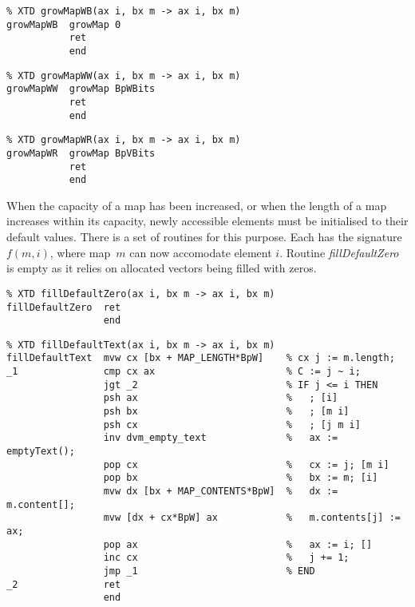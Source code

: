 {\small
\begin{verbatim}
% XTD growMapWB(ax i, bx m -> ax i, bx m)
growMapWB  growMap 0
           ret
           end
\end{verbatim}}

{\small
\begin{verbatim}
% XTD growMapWW(ax i, bx m -> ax i, bx m)
growMapWW  growMap BpWBits
           ret
           end
\end{verbatim}}

{\small
\begin{verbatim}
% XTD growMapWR(ax i, bx m -> ax i, bx m)
growMapWR  growMap BpVBits
           ret
           end
\end{verbatim}}

When the capacity of a map has been increased, or when the length of a map
increases within its capacity, newly accessible elements must be initialised to their default values. There is a set of routines for this purpose. Each has the signature $f(m,i)$, where map~$m$ can now accomodate element $i$. Routine \emph{fillDefaultZero} is empty as it relies on allocated vectors being filled with zeros.

\begin{tabbing}
\indents
{}
\fin
\end{tabbing}

{\small
\begin{verbatim}
% XTD fillDefaultZero(ax i, bx m -> ax i, bx m)
fillDefaultZero  ret
                 end
\end{verbatim}}

\begin{tabbing}
\indents
{}
\fin
\end{tabbing}

{\small
\begin{verbatim}
% XTD fillDefaultText(ax i, bx m -> ax i, bx m)
fillDefaultText  mvw cx [bx + MAP_LENGTH*BpW]    % cx j := m.length;
_1               cmp cx ax                       % C := j ~ i;
                 jgt _2                          % IF j <= i THEN
                 psh ax                          %   ; [i]
                 psh bx                          %   ; [m i]
                 psh cx                          %   ; [j m i]
                 inv dvm_empty_text              %   ax := emptyText();
                 pop cx                          %   cx := j; [m i]
                 pop bx                          %   bx := m; [i]
                 mvw dx [bx + MAP_CONTENTS*BpW]  %   dx := m.content[];
                 mvw [dx + cx*BpW] ax            %   m.contents[j] := ax;
                 pop ax                          %   ax := i; []
                 inc cx                          %   j += 1;
                 jmp _1                          % END
_2               ret
                 end
\end{verbatim}}

